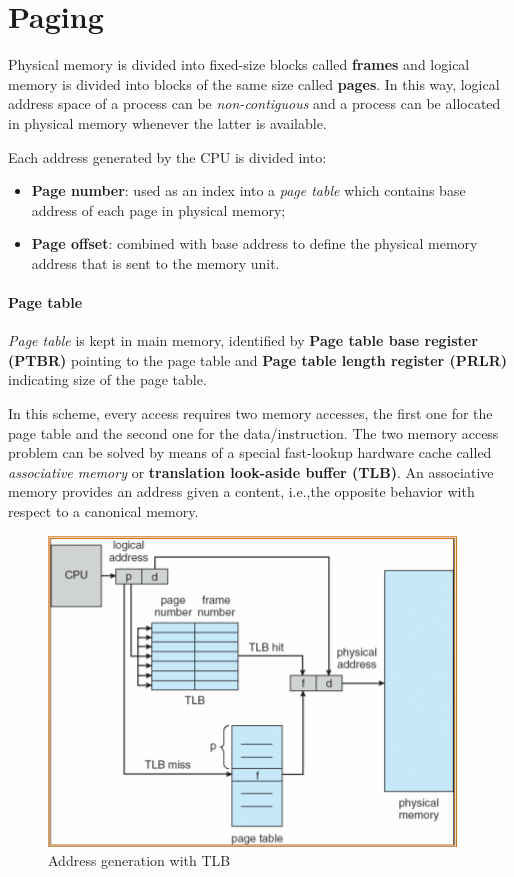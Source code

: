 \section{Paging}
Physical memory is divided into fixed-size blocks called \textbf{frames} and logical memory is divided into blocks of the same size called \textbf{pages}. In this way, logical address space of a process can be \emph{non-contiguous} and a process can be allocated in physical memory whenever the latter is available.

Each address generated by the CPU is divided into:
\begin{itemize}
\item \textbf{Page number}: used as an index into a \emph{page table} which contains base address of each page in physical memory;
\item \textbf{Page offset}: combined with base address to define the physical memory address that is sent to the memory unit.
\end{itemize}

\paragraph{Page table} \emph{Page table} is kept in main memory, identified by \textbf{Page table base register (PTBR)} pointing to the page table and \textbf{Page table length register (PRLR)} indicating size of the page table.

In this scheme, every access requires two memory accesses, the first one for the page table and the second one for the data/instruction. The two memory access problem can be solved by means of a special fast-lookup hardware cache called \emph{associative memory} or \textbf{translation look-aside buffer (TLB)}. An associative memory provides an address given a content, i.e.,\@ the opposite behavior with respect to a canonical memory.

\begin{figure}[hbtp]
\centering
\includegraphics[scale=0.5]{images/memory_management/address_generation_tlb.jpg}
\caption{Address generation with TLB}
\end{figure}

